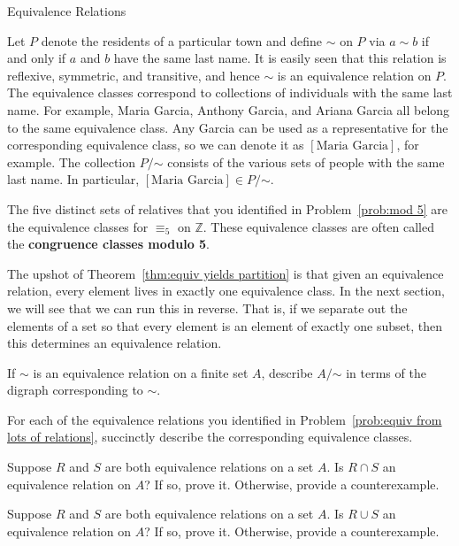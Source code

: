 \begin{section}{Equivalence Relations}
\begin{example}\label{ex:last name}
Let $P$ denote the residents of a particular town and define $\sim$ on $P$ via $a\sim b$ if and only if $a$ and $b$ have the same last name. It is easily seen that this relation is reflexive, symmetric, and transitive, and hence $\sim$ is an equivalence relation on $P$.  The equivalence classes correspond to collections of individuals with the same last name.  For example, Maria Garcia, Anthony Garcia, and Ariana Garcia all belong to the same equivalence class.  Any Garcia can be used as a representative for the corresponding equivalence class, so we can denote it as $[\text{Maria Garcia}]$, for example. The collection $P/\mathord\sim$ consists of the various sets of people with the same last name.  In particular, $[\text{Maria Garcia}]\in P/\mathord\sim$.
\end{example}

\begin{example}
The five distinct sets of relatives that you identified in Problem~\ref{prob:mod 5} are the equivalence classes for $\equiv_5$ on $\mathbb{Z}$. These equivalence classes are often called the \textbf{congruence classes modulo 5}.
\end{example}

The upshot of Theorem~\ref{thm:equiv yields partition} is that given an equivalence relation, every element lives in exactly one equivalence class.  In the next section, we will see that we can run this in reverse.  That is, if we separate out the elements of a set so that every element is an element of exactly one subset, then this determines an equivalence relation.

\begin{problem}
If $\sim$ is an equivalence relation on a finite set $A$, describe $A/\mathord\sim$ in terms of the digraph corresponding to $\sim$.
\end{problem}

\begin{problem}
For each of the equivalence relations you identified in Problem~\ref{prob:equiv from lots of relations}, succinctly describe the corresponding equivalence classes.
\end{problem}

\begin{problem}
Suppose $R$ and $S$ are both equivalence relations on a set $A$. Is $R\cap S$ an equivalence relation on $A$? If so, prove it.  Otherwise, provide a counterexample.
\end{problem}

\begin{problem}
Suppose $R$ and $S$ are both equivalence relations on a set $A$. Is $R\cup S$ an equivalence relation on $A$? If so, prove it.  Otherwise, provide a counterexample.
\end{problem}

\end{section}